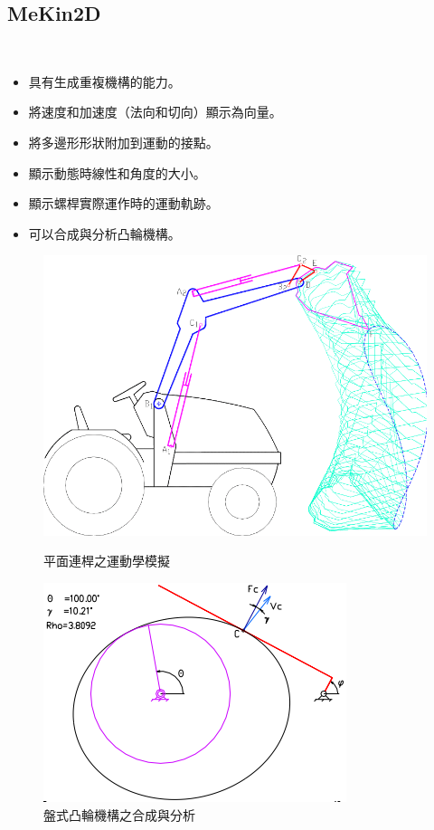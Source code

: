 \documentclass[14pt,a4paper]{report}  %
\newcommand{\fourteen}{\fontsize{14pt}{\baselineskip}\selectfont}%
\begin{document}
      	\subsection{MeKin2D}
       		\hspace*{\fill} \\
       	\fourteen {MeKin2D是用Free Pascal編寫的子程序包，主要使用模組化方法對平面連桿機構進行運動學模擬，用於凸輪機構的合成和分析，以及漸開線齒輪的產生。MeKin2D的獨特功能包括:}
       \begin{itemize}
       \item 具有生成重複機構的能力。
       \item 將速度和加速度（法向和切向）顯示為向量。
       \item 將多邊形形狀附加到運動的接點。
       \item 顯示動態時線性和角度的大小。
       \item 顯示螺桿實際運作時的運動軌跡。
       \item 可以合成與分析凸輪機構。
\end{itemize}        
       	\begin{figure}[H]
        	\centering
        	\includegraphics[scale=0.4]{平面連桿之運動學模擬.png} 
        	\caption{平面連桿之運動學模擬} 
        	\label{fig:scale}
        	\includegraphics[scale=0.8]{盤式凸輪機構之合成與分析.png} 
        	\caption{盤式凸輪機構之合成與分析} 
        	\label{fig:scale}   
    	\end{figure}
		 	\hspace*{\fill} \\
\end{document}
